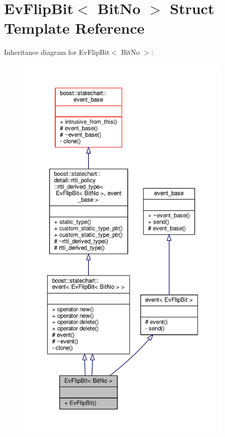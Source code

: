 \hypertarget{struct_ev_flip_bit}{}\section{Ev\+Flip\+Bit$<$ Bit\+No $>$ Struct Template Reference}
\label{struct_ev_flip_bit}


Inheritance diagram for Ev\+Flip\+Bit$<$ Bit\+No $>$\+:
\nopagebreak
\begin{figure}[H]
\begin{center}
\leavevmode
\includegraphics[height=550pt]{struct_ev_flip_bit__inherit__graph}
\end{center}
\end{figure}



